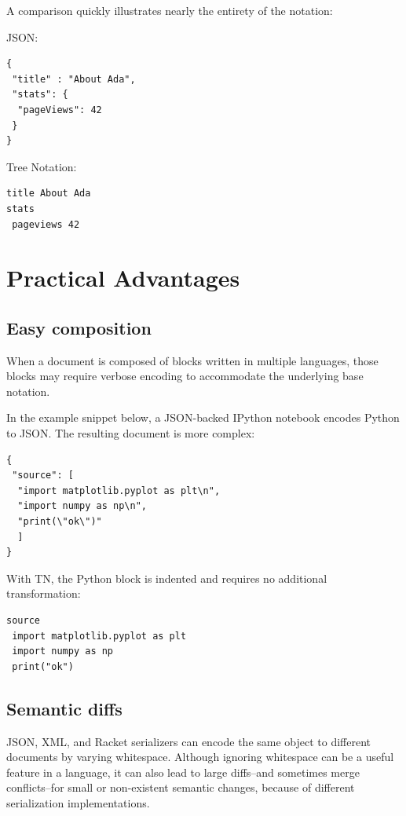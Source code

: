 \documentclass[journal]{IEEEtran}
\begin{document}
A comparison quickly illustrates nearly the entirety of the notation:

JSON:

\begin{lstlisting}
{
 "title" : "About Ada",
 "stats": {
  "pageViews": 42
 }
}
\end{lstlisting}

Tree Notation:

\begin{lstlisting}
title About Ada
stats
 pageviews 42
\end{lstlisting}

\section{Practical Advantages}

\subsection{Easy composition}

When a document is composed of blocks written in multiple languages, those blocks may require verbose encoding to accommodate the underlying base notation.

In the example snippet below, a JSON-backed IPython notebook encodes Python to JSON. The resulting document is more complex:

\begin{lstlisting}
{
 "source": [
  "import matplotlib.pyplot as plt\n",
  "import numpy as np\n",
  "print(\"ok\")"
  ]
}
\end{lstlisting}

With TN, the Python block is indented and requires no additional transformation:

\begin{lstlisting}
source
 import matplotlib.pyplot as plt
 import numpy as np
 print("ok")
\end{lstlisting}

\subsection{Semantic diffs}

JSON, XML, and Racket serializers can encode the same object to different documents by varying whitespace. Although ignoring whitespace can be a useful feature in a language, it can also lead to large diffs--and sometimes merge conflicts--for small or non-existent semantic changes, because of different serialization implementations.
\end{document}
